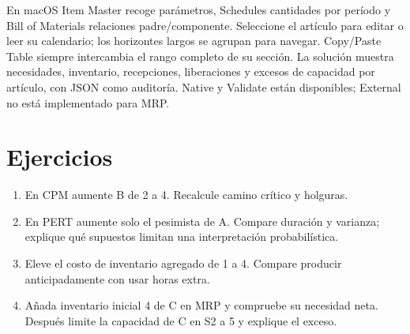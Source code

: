 En macOS Item Master recoge parámetros, Schedules cantidades por período y
Bill of Materials relaciones padre/componente. Seleccione el artículo para
editar o leer su calendario; los horizontes largos se agrupan para navegar.
Copy/Paste Table siempre intercambia el rango completo de su sección.
La solución muestra necesidades, inventario, recepciones, liberaciones y excesos
de capacidad por artículo, con JSON como auditoría. Native y Validate están
disponibles; External no está implementado para MRP.

\section{Ejercicios}
\begin{enumerate}
\item En CPM aumente B de 2 a 4. Recalcule camino crítico y holguras.
\item En PERT aumente solo el pesimista de A. Compare duración y varianza;
      explique qué supuestos limitan una interpretación probabilística.
\item Eleve el costo de inventario agregado de 1 a 4. Compare producir
      anticipadamente con usar horas extra.
\item Añada inventario inicial 4 de C en MRP y compruebe su necesidad neta.
      Después limite la capacidad de C en S2 a 5 y explique el exceso.
\end{enumerate}
